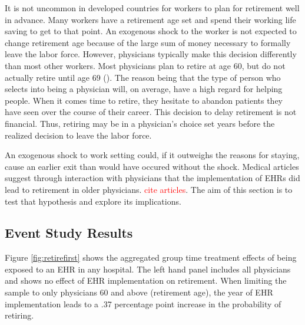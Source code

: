 \documentclass[11pt]{article}
\begin{document}
It is not uncommon in developed countries for workers to plan for retirement well in advance. Many workers have a retirement age set and spend their working life saving to get to that point. An exogenous shock to the worker is not expected to change retirement age because of the large sum of money necessary to formally leave the labor force. However, physicians typically make this decision differently than most other workers. Most physicians plan to retire at age 60, but do not actually retire until age 69 (\cite{collier2017challenges}). The reason being that the type of person who selects into being a physician will, on average, have a high regard for helping people. When it comes time to retire, they hesitate to abandon patients they have seen over the course of their career. This decision to delay retirement is not financial. Thus, retiring may be in a physician's choice set years before the realized decision to leave the labor force. 

An exogenous shock to work setting could, if it outweighs the reasons for staying, cause an earlier exit than would have occured without the shock. Medical articles suggest through interaction with physicians that the implementation of EHRs did lead to retirement in older physicians. \textcolor{red}{cite articles}. The aim of this section is to test that hypothesis and explore its implications. 

\subsection{Event Study Results}

Figure \ref{fig:retirefirst} shows the aggregated group time treatment effects of being exposed to an EHR in any hospital. The left hand panel includes all physicians and shows no effect of EHR implementation on retirement. When limiting the sample to only physicians 60 and above (retirement age), the year of EHR implementation leads to a .37 percentage point increase in the probability of retiring. 
\end{document}
